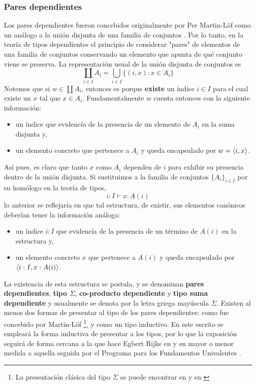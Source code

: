 \documentclass{article}
\begin{document}
    \subsubsection{Pares dependientes}
    Los pares dependientes fueron concebidos originalmente por Per 
    Martin-L\"{o}f como un an\'{a}logo a la uni\'{o}n disjunta de una familia de 
    conjuntos \cite{PerMartin-Lof98}. Por lo tanto, en la teoría de tipos 
    dependientes el principio de considerar "pares" de elementos de una familia 
    de conjuntos conservando un elemento que apunta de qu\'{e} conjunto viene se 
    preserva. La representaci\'{o}n usual de la uni\'{o}n disjunta de conjuntos 
    es
    $$
        \coprod\limits_{i\in I} A_i = \bigcup\limits_{i\in I} \{(i, x) : x \in A_i\}
    $$
    Notemos que si $w \in \coprod A_i$, entonces es porque \textbf{existe}
    un \'{i}ndice $i \in I$ para el cual existe un $x$ tal que $x \in A_i$.
    Fundamentalmente $w$ cuenta entonces con la siguiente información:
    \begin{itemize}
        \item un \'{i}ndice que evidenc\'{i}a de la presencia de un elemento de 
        $A_i$ en la suma disjunta y,
        \item un elemento concreto que pertenece a $A_i$ y queda encapsulado por 
        $w = \langle i, x \rangle$.
    \end{itemize}
    As\'{i} pues, es claro que tanto $x$ como $A_i$ dependen de $i$ para 
    exhibir su presencia dentro de la uni\'{o}n disjunta.
    Si sustituimos a la familia de conjuntos $\{A_i\}_{i\in I}$ por su 
    hom\'{o}logo en la teoría de tipos, 
    $$
        i : I \vdash x : A(i)
    $$
    lo anterior se reflejar\'{i}a en que tal estructura, de existir, sus 
    elementos can\'{o}nicos deberían tener la información an\'{a}loga:
    \begin{itemize}
        \item un \'{i}ndice $i : I$ que evidenc\'{i}a de la presencia de un 
        t\'{e}rmino de $A(i)$ en la estructura y,
        \item un elemento concreto $x$ que pertenece a $A(i)$ y queda 
        encapsulado por $\langle i : I, x : A(i) \rangle$.
    \end{itemize}
    La existencia de esta estructura se postula, y se denominan
    \textbf{pares dependientes}, \textbf{tipo $\Sigma$}, 
    \textbf{co-producto dependiente} y \textbf{tipo suma dependiente} y 
    usualmente se denota por la letra griega may\'{u}scula $\Sigma$.
    Existen al menos dos formas de presentar al tipo de los pares dependientes:
    como fue concebido por Martin-Löf \footnote{La presentación clásica del tipo 
    $\Sigma$ se puede encontrar en \cite{UnivalentFoundationsProgram30} y en 
    \cite{PerMartin-Lof98}}, y como un tipo inductivo. En este escrito
    se empleará la forma inductiva de presentar a los tipos, por lo que la
    exposición seguirá de forma cercana a la que hace Egbert Rijke en 
    \cite{EgbertRijke26} y en mayor o menor medida a aquella seguida por el 
    Programa para los Fundamentos Univalentes \cite{UnivalentFoundationsProgram30}.
    
\end{document}
